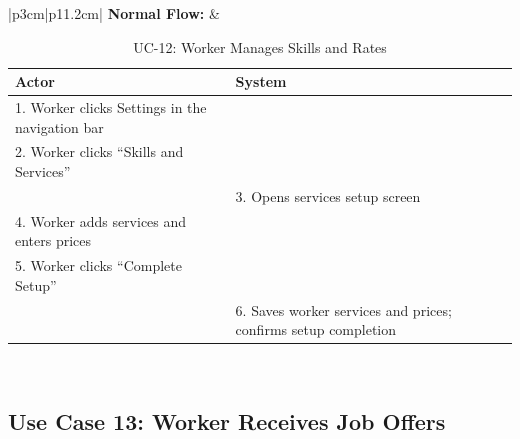 {\small
\renewcommand{\arraystretch}{1.05}
\begin{table}[H]
\centering
\begin{tabular}{|p{3cm}|p{11.2cm}|}
\hline
\textbf{Normal Flow:} &
\begin{tabular}[t]{|p{5.4cm}|p{5.4cm}|}
\hline
\textbf{Actor} & \textbf{System} \\ \hline
1. Worker clicks Settings in the navigation bar & \\ \hline
2. Worker clicks ``Skills and Services'' & \\ \hline
 & 3. Opens services setup screen \\ \hline
4. Worker adds services and enters prices & \\ \hline
5. Worker clicks ``Complete Setup'' & \\ \hline
 & 6. Saves worker services and prices; confirms setup completion \\ \hline
\end{tabular} \\ \hline
\end{tabular}
\caption{UC-12: Worker Manages Skills and Rates}
\end{table}
}

\newpage

\subsection*{Use Case 13: Worker Receives Job Offers}

